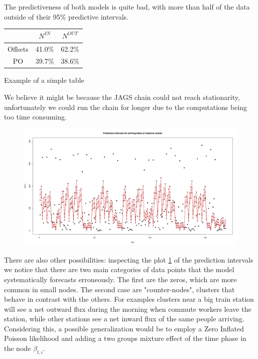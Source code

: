 \documentclass[11pt,twoside]{report}
\begin{document}
The predictiveness of both models is quite bad, with more than half of the data outside of their 95\% predictive intervals.

\begin{center}
	\begin{tabular}{ |c|c|c| } 
		\hline
		& $N^{IN}$ & $N^{OUT}$ \\ 
		\hline
		Offsets & 41.0\% & 62.2\% \\ 
		PO & 39.7\% & 38.6\% \\ 
		\hline
	\end{tabular}
\end{center}

Example of a simple table


We believe it might be because the JAGS chain could not reach stationarity, unfortunately we could run the chain for longer due to the computations being too time consuming. \\

\begin{figure}[H]
	\centering
	\includegraphics[width=120 mm]{pictures/cadorna_nin.png}
	\caption{}
	\label{fig:network_pred}
\end{figure}

There are also other possibilities: inspecting the plot \ref{fig:network_pred} of the prediction intervals we notice that there are two main categories of data points that the model systematically forecasts erroneously. The first are the zeros, which are more common in small nodes. The second case are "counter-nodes", clusters that behave in contrast with the others. For examples clusters near a big train station will see a net outward flux during the morning when commute workers leave the station, while other stations see a net inward flux of the same people arriving. Considering this, a possible generalization would be to employ a Zero Inflated Poisson likelihood and adding a two groups mixture effect of the time phase in the node $\beta_{t,i}$. 
\end{document}
